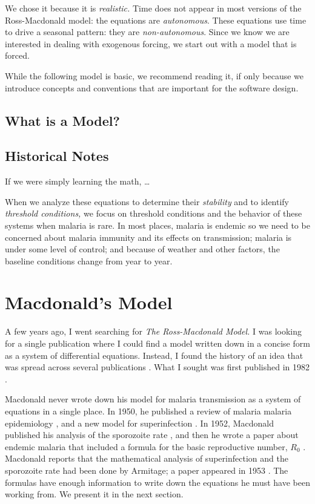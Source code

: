 \documentclass[
]{book}
\begin{document}
We chose it because it is \emph{realistic.} Time does not appear in most versions of the Ross-Macdonald model: the equations are \emph{autonomous}. These equations use time to drive a seasonal pattern: they are \emph{non-autonomous}. Since we know we are interested in dealing with exogenous forcing, we start out with a model that is forced.

While the following model is basic, we recommend reading it, if only because we introduce concepts and conventions that are important for the software design.

\section{What is a Model?}\label{what-is-a-model}

\section{Historical Notes}\label{historical-notes-1}

If we were simply learning the math, \ldots{}

When we analyze these equations to determine their \emph{stability} and to identify \emph{threshold conditions,} we focus on threshold conditions and the behavior of these systems when malaria is rare. In most places, malaria is endemic so we need to be concerned about malaria immunity and its effects on transmission; malaria is under some level of control; and because of weather and other factors, the baseline conditions change from year to year.

\chapter{Macdonald's Model}\label{macdonalds-model}

A few years ago, I went searching for \emph{The Ross-Macdonald Model.} I was looking for a single publication where I could find a model written down in a concise form as a system of differential equations. Instead, I found the history of an idea that was spread across several publications \autocite{SmithDL2012_RossMacdonald}.
What I sought was first published in 1982 \autocite{AronJL1982PopulationDynamics,BaileyNTJ1982BiomathematicsMalaria}.

Macdonald never wrote down his model for malaria transmission as a system of equations in a single place.
In 1950, he published a review of malaria malaria epidemiology \autocite{MacdonaldG1950Epidemiology}, and a new model for superinfection \autocite{MacdonaldG1950Superinfection}.
In 1952, Macdonald published his analysis of the sporozoite rate \autocite{MacdonaldG1952Sporozoite}, and then he wrote a paper about endemic malaria that included a formula for the basic reproductive number, \(R_0\) \autocite{MacdonaldG1952R0}.
Macdonald reports that the mathematical analysis of superinfection and the sporozoite rate had been done by Armitage; a paper appeared in 1953 \autocite{ArmitageP1953}.
The formulas have enough information to write down the equations he must have been working from.
We present it in the next section.
\end{document}
